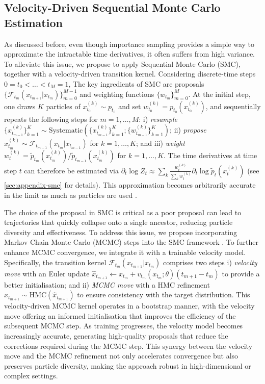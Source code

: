 \subsection{Velocity-Driven Sequential Monte Carlo Estimation}
As discussed before, even though importance sampling provides a simple way to approximate the intractable time derivatives, it often suffers from high variance.
To alleviate this issue, we propose to apply Sequential Monte Carlo (SMC), together with a velocity-driven transition kernel.
Considering discrete-time steps $0=t_0 < \dots < t_M = 1$,
The key ingredients of SMC are proposals $\{\mathcal{F}_{t_m} (x_{t_{m+1}} | x_{t_m})\}_{m=0}^{M-1}$ and weighting functions $\{w_{t_m}\}_{m=0}^M$. At the initial step, one draws $K$ particles of $x_{t_0}^{(k)} \sim p_{t_0}$ and set $w_{t_0}^{(k)} = p_{t_0} (x_{t_0}^{(k)})$, and sequentially repeats the following steps for $m=1,\dots,M$: i) \textit{resample} $\{x_{t_{m-1}}^{(k)}\}_{k=1}^K \sim \mathrm{Systematic}(\{x_{t_{m-1}}^{(k)}\}_{k=1}^K; \{w_{t_{m-1}}^{(k)}\}_{k=1}^K)$; ii) \textit{propose} $x_{t_m}^{(k)} \sim \mathcal{F}_{t_{m-1}}(x_{t_m} | x_{t_{m-1}})$ for $k=1,\dots,K$; and iii) \textit{weight} $w_t^{(k)} = \tilde{p}_{t_m}(x_{t_m}^{(k)}) / \tilde{p}_{t_{m-1}}(x_{t_m}^{(k)})$ for $k=1,\dots,K$.  
The time derivatives at time step $t$ can therefore be estimated via $\partial_t \log Z_t \approx \sum_k \frac{w_t^{(k)}}{\sum_k w_t^{(k)}} \partial_t \log \tilde{p}_t (x_t^{(k)})$ (see \cref{sec:appendix-smc} for details). This approximation becomes arbitrarily accurate in the limit as much as particles are used \cite[Proposition 11.4]{chopin2020introduction}.

The choice of the proposal in SMC is critical as a poor proposal can lead to trajectories that quickly collapse onto a single ancestor, reducing particle diversity and effectiveness. To address this issue,  we propose incorporating Markov Chain Monte Carlo (MCMC) steps into the SMC framework \citep{van2000unscented}. To further enhance MCMC convergence, we integrate it with a trainable velocity model. Specifically, the transition kernel $\mathcal{F}_{t_m} (x_{t_{m+1}} | x_{t_m})$ comprises two steps i) \textit{velocity move} with an Euler update $\hat{x}_{t_{m+1}} \!\!\!\leftarrow\! x_{t_m} \!\!+ v_{t_m}(x_{t_m}; \theta) (t_{m+1}\!-t_m)$ to provide a better initialisation; and ii) \textit{MCMC move} with a HMC \citep{neal2012mcmc} refinement $x_{t_{m+1}} \!\sim\! \mathrm{HMC}(\hat{x}_{t_{m+1}})$ to ensure consistency with the target distribution.
This velocity-driven MCMC kernel operates in a bootstrap manner, with the velocity move offering an informed initialisation that improves the efficiency of the subsequent MCMC step. As training progresses, the velocity model becomes increasingly accurate, generating high-quality proposals that reduce the corrections required during the MCMC step. This synergy between the velocity move and the MCMC refinement not only accelerates convergence but also preserves particle diversity, making the approach robust in high-dimensional or complex settings.

